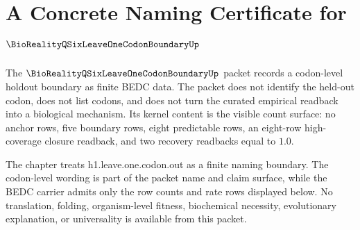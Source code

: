 \chapter{A Concrete Naming Certificate for $\BioRealityQSixLeaveOneCodonBoundaryUp$}
\label{ch:concrete-instances-bioreality_q_six_leave_one_codon_boundary-namecert}

The $\BioRealityQSixLeaveOneCodonBoundaryUp$ packet records a codon-level holdout boundary as finite BEDC data. The packet does not identify the held-out codon, does not list codons, and does not turn the curated empirical readback into a biological mechanism. Its kernel content is the visible count surface: no anchor rows, five boundary rows, eight predictable rows, an eight-row high-coverage closure readback, and two recovery readbacks equal to $1.0$.

The chapter treats h1.leave.one.codon.out as a finite naming boundary. The codon-level wording is part of the packet name and claim surface, while the BEDC carrier admits only the row counts and rate rows displayed below. No translation, folding, organism-level fitness, biochemical necessity, evolutionary explanation, or universality is available from this packet.

